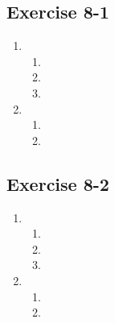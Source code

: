 \subsection{Exercise 8-1} %
\begin{enumerate}[label=\textbf{\arabic*}.]
\item %
 \begin{enumerate}[noitemsep, label=\textbf{(\alph*)} ] 
\item %
\item %
\item %
\end{enumerate}

\item %
 \begin{enumerate}[noitemsep, label=\textbf{(\alph*)} ] 
\item %
\item %
\end{enumerate}
\end{enumerate}

\subsection{Exercise 8-2} %
\begin{enumerate}[noitemsep, label=\textbf{\arabic*}. ]
\item %
 \begin{enumerate}[noitemsep, label=\textbf{(\alph*)} ] 
\item %
\item %
\item %
\end{enumerate}

\item %
\begin{enumerate}[noitemsep, label=\textbf{(\alph*)} ] 
\item %
\item %
\end{enumerate}
\end{enumerate}


